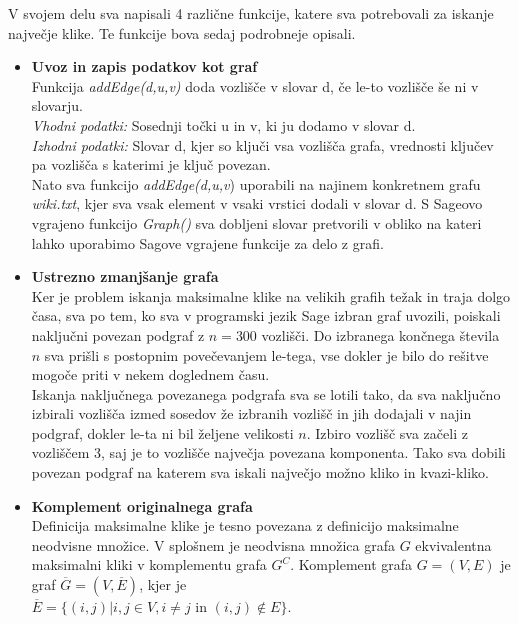 \documentclass[12pt,a4paper]{amsart}
\theoremstyle{definition}
\theoremstyle{plain}
\begin{document}
V svojem delu sva napisali 4 različne funkcije, katere sva potrebovali za iskanje največje klike. Te funkcije bova sedaj podrobneje opisali.

\begin{itemize}
\item \textbf{Uvoz in zapis podatkov kot graf}
\\

Funkcija \textit{addEdge(d,u,v)} doda vozlišče v slovar d, če le-to  vozlišče še ni v slovarju. 
\\

\textit{Vhodni podatki:} Sosednji točki u in v, ki ju dodamo v slovar d.
\\

\textit{Izhodni podatki:} Slovar d, kjer so ključi vsa vozlišča grafa, vrednosti ključev pa vozlišča s katerimi je ključ povezan.
\\

Nato sva funkcijo \textit{addEdge(d,u,v}) uporabili na najinem konkretnem grafu \textit{wiki.txt}, kjer sva vsak element v vsaki vrstici dodali v slovar d.
S Sageovo vgrajeno funkcijo \textit{Graph()} sva dobljeni slovar pretvorili v obliko na kateri lahko uporabimo Sagove vgrajene funkcije za delo z grafi.\\

\item \textbf{Ustrezno zmanjšanje grafa}
\\

Ker je problem iskanja maksimalne klike na velikih grafih težak in traja dolgo časa, sva po tem, ko sva v programski jezik Sage izbran graf uvozili, poiskali naključni povezan podgraf z $n = 300$ vozlišči. Do izbranega končnega števila $n$ sva prišli s postopnim povečevanjem le-tega, vse dokler je bilo do rešitve mogoče priti v nekem doglednem času. 
\\

Iskanja naključnega povezanega podgrafa sva se lotili tako, da sva naključno izbirali vozlišča izmed sosedov že izbranih vozlišč in jih dodajali v najin podgraf, dokler le-ta ni bil željene velikosti $n$. Izbiro vozlišč sva začeli z vozliščem 3, saj je to vozlišče največja povezana komponenta. Tako sva dobili povezan podgraf na katerem sva iskali največjo možno kliko in kvazi-kliko.\\
\item \textbf{Komplement originalnega grafa}
\\

Definicija maksimalne klike je tesno povezana z definicijo maksimalne neodvisne množice. V splošnem je neodvisna množica grafa $G$ ekvivalentna maksimalni kliki v komplementu grafa $G^C$. 
Komplement grafa $G = (V, E)$ je graf $\overline{G} = (V, \overline{E})$, kjer je\\ $\overline{E} = \{(i, j) | i, j \in V, i \ne j\text{ in } (i, j) \not\in E\}$. \\


\end{itemize}
\end{document}

